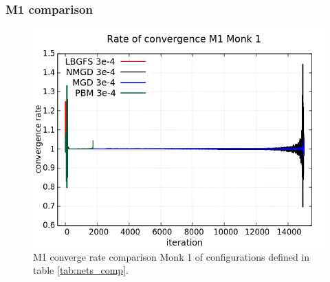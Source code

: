 \subsubsection{M1 comparison}
\begin{figure}[H]
	\centering
	\includegraphics[width=0.6\linewidth]{data/Comparison/Monk1/Monk1_M1_CR_standard.png}
	\caption{M1 converge rate comparison Monk 1 of configurations defined in table \ref{tab:nets_comp}.}
	\label{fig:CR-M1-Monk1-Standard}
\end{figure}


